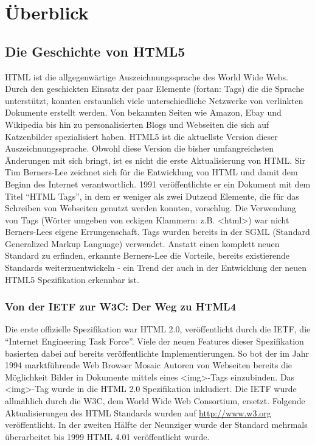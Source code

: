 \chapter{Überblick}
\section{Die Geschichte von HTML5}
HTML ist die allgegenwärtige Auszeichnungssprache des World Wide Webs. Durch den geschickten Einsatz der paar Elemente (fortan: Tags) die die Sprache unterstützt, konnten erstaunlich viele unterschiedliche Netzwerke von verlinkten Dokumente erstellt werden. Von bekannten Seiten wie Amazon, Ebay und Wikipedia bis hin zu personalisierten Blogs und Webseiten die sich auf Katzenbilder spezialisiert haben.
HTML5 ist die aktuellste Version dieser Auszeichnungssprache. Obwohl diese
Version die bisher umfangreichsten Änderungen mit sich bringt, ist es nicht die
erste Aktualisierung von HTML.
Sir Tim Berners-Lee zeichnet sich für die Entwicklung von HTML und damit dem
Beginn des Internet verantwortlich. 1991 veröffentlichte er ein Dokument mit dem
Titel ``HTML Tags'', in dem er weniger als zwei Dutzend Elemente, die für das
Schreiben von Webseiten genutzt werden konnten, vorschlug.
Die Verwendung von Tags (Wörter umgeben von eckigen Klammern: z.B. <html>) war
nicht Berners-Lees eigene Errungenschaft. Tags wurden bereits in der SGML
(Standard Generalized Markup Language) verwendet.
Anstatt einen komplett neuen Standard zu erfinden, erkannte Berners-Lee die
Vorteile, bereits existierende Standards weiterzuentwickeln - ein Trend der auch
in der Entwicklung der neuen HTML5 Spezifikation erkennbar ist.

\subsection{Von der IETF zur W3C: Der Weg zu HTML4}
Die erste offizielle Spezifikation war HTML 2.0, veröffentlicht durch die IETF,
die ``Internet Engineering Task Force''. Viele der neuen Features dieser
Spezifikation basierten dabei auf bereits veröffentlichte Implementierungen. So
bot der im Jahr 1994 marktführende Web Browser Mosaic Autoren von Webseiten
bereits die Möglichkeit Bilder in Dokumente mittels eines <img>-Tags
einzubinden. Das <img>-Tag wurde in die HTML 2.0 Spezifikation inkludiert.
Die IETF wurde allmählich durch die W3C, dem World Wide Web Consortium, ersetzt.
Folgende Aktualisierungen des HTML Standards wurden auf \url{http://www.w3.org}
veröffentlicht. In der zweiten Hälfte der Neunziger wurde der Standard mehrmals
überarbeitet bis 1999 HTML 4.01 veröffentlicht wurde.

